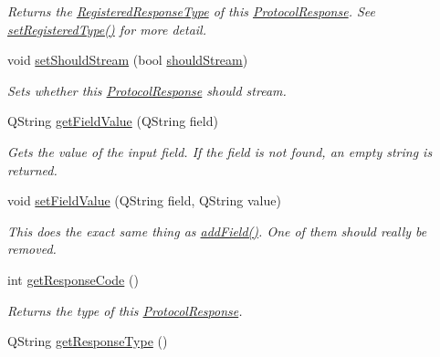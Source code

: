 \begin{DoxyCompactItemize}
\begin{DoxyCompactList}\small\item\em Returns the \hyperlink{namespace_picto_1_1_registered_response_type}{Registered\-Response\-Type} of this \hyperlink{struct_picto_1_1_protocol_response}{Protocol\-Response}. See \hyperlink{struct_picto_1_1_protocol_response_aa5910317b77d6d533f975d55d54cfe9b}{set\-Registered\-Type()} for more detail. \end{DoxyCompactList}\item 
void \hyperlink{struct_picto_1_1_protocol_response_ab6c434488e4661d2917618dfdb8977f4}{set\-Should\-Stream} (bool \hyperlink{struct_picto_1_1_protocol_response_a3c320aa18ca6e34f3f7307d622505db1}{should\-Stream})
\begin{DoxyCompactList}\small\item\em Sets whether this \hyperlink{struct_picto_1_1_protocol_response}{Protocol\-Response} should stream. \end{DoxyCompactList}\item 
\hypertarget{struct_picto_1_1_protocol_response_acb1dcfcf369c0c22466d2983450bc0c4}{Q\-String \hyperlink{struct_picto_1_1_protocol_response_acb1dcfcf369c0c22466d2983450bc0c4}{get\-Field\-Value} (Q\-String field)}\label{struct_picto_1_1_protocol_response_acb1dcfcf369c0c22466d2983450bc0c4}

\begin{DoxyCompactList}\small\item\em Gets the value of the input field. If the field is not found, an empty string is returned. \end{DoxyCompactList}\item 
\hypertarget{struct_picto_1_1_protocol_response_a282039f53393f6dc96b466ad41208422}{void \hyperlink{struct_picto_1_1_protocol_response_a282039f53393f6dc96b466ad41208422}{set\-Field\-Value} (Q\-String field, Q\-String value)}\label{struct_picto_1_1_protocol_response_a282039f53393f6dc96b466ad41208422}

\begin{DoxyCompactList}\small\item\em This does the exact same thing as \hyperlink{struct_picto_1_1_protocol_response_a9fa9c893189686ea4da560db89efaca9}{add\-Field()}. One of them should really be removed. \end{DoxyCompactList}\item 
int \hyperlink{struct_picto_1_1_protocol_response_a71d3134d2731be4a5cd53a0ce3ad4790}{get\-Response\-Code} ()
\begin{DoxyCompactList}\small\item\em Returns the type of this \hyperlink{struct_picto_1_1_protocol_response}{Protocol\-Response}. \end{DoxyCompactList}\item 
\hypertarget{struct_picto_1_1_protocol_response_aea9aabab39e1307740db8bb732b5d49c}{Q\-String \hyperlink{struct_picto_1_1_protocol_response_aea9aabab39e1307740db8bb732b5d49c}{get\-Response\-Type} ()}\label{struct_picto_1_1_protocol_response_aea9aabab39e1307740db8bb732b5d49c}


\end{DoxyCompactItemize}
